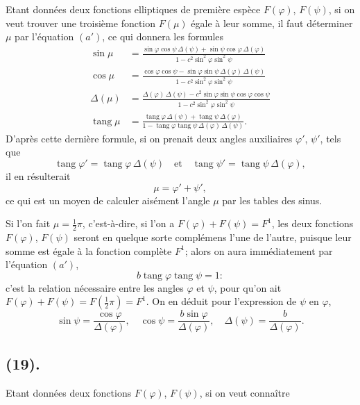 \documentclass{article}
\begin{document}
Etant données deux fonctions elliptiques de première espèce $F(\varphi)$, $F(\psi)$, si on veut trouver une troisième fonction $F(\mu)$ égale à leur somme, il faut déterminer $\mu$ par l'équation $(a')$, ce qui donnera les formules
\[ \begin{aligned} \sin\mu &= \frac{\sin\varphi\cos\psi\,\Delta(\psi)+\sin\psi\cos\varphi\,\Delta(\varphi)}{1-c^{2}\sin^{2}\varphi\sin^{2}\psi} \\ \cos\mu &= \frac{\cos\varphi\cos\psi-\sin\varphi\sin\psi\,\Delta(\varphi)\,\Delta(\psi)}{1-c^{2}\sin^{2}\varphi\sin^{2}\psi} \\ \Delta(\mu) &= \frac{\Delta(\varphi)\,\Delta(\psi)-c^{2}\sin\varphi\sin\psi\cos\varphi\cos\psi}{1-c^{2}\sin^{2}\varphi\sin^{2}\psi} \\ \operatorname{tang}\mu &= \frac{\operatorname{tang}\varphi\,\Delta(\psi)+\operatorname{tang}\psi\,\Delta(\varphi)}{1-\operatorname{tang}\varphi\operatorname{tang}\psi\,\Delta(\varphi)\,\Delta(\psi)}. \end{aligned} \]
D'après cette dernière formule, si on prenait deux angles auxiliaires $\varphi'$, $\psi'$, tels que
\[ \operatorname{tang}\varphi'=\operatorname{tang}\varphi\,\Delta(\psi) \quad\text{et}\quad \operatorname{tang}\psi'=\operatorname{tang}\psi\,\Delta(\varphi), \]
il en résulterait
\[ \mu=\varphi'+\psi', \]
ce qui est un moyen de calculer aisément l'angle $\mu$ par les tables des sinus.

Si l'on fait $\mu=\frac{1}{2}\pi$, c'est-à-dire, si l'on a $F(\varphi)+F(\psi)=F^{1}$, les deux fonctions $F(\varphi)$, $F(\psi)$ seront en quelque sorte complémens l'une de l'autre, puisque leur somme est égale à la fonction complète $F^{1}$; alors on aura immédiatement par l'équation $(a')$,
\[ b\operatorname{tang}\varphi\operatorname{tang}\psi=1: \]
c'est la relation nécessaire entre les angles $\varphi$ et $\psi$, pour qu'on ait $F(\varphi)+F(\psi)=F(\frac{1}{2}\pi)=F^{1}$. On en déduit pour l'expression de $\psi$ en $\varphi$,
\[ \sin\psi=\frac{\cos\varphi}{\Delta(\varphi)}, \quad \cos\psi=\frac{b\sin\varphi}{\Delta(\varphi)}, \quad \Delta(\psi)=\frac{b}{\Delta(\varphi)}. \]

\subsection*{(19).}

Etant données deux fonctions $F(\varphi)$, $F(\psi)$, si on veut connaître
\end{document}
